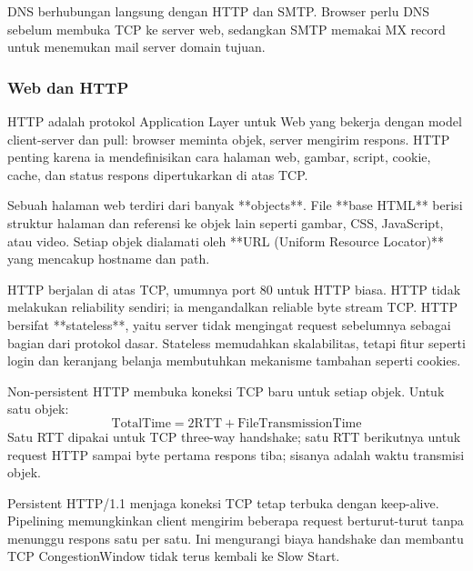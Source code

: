 DNS berhubungan langsung dengan HTTP dan SMTP. Browser perlu DNS sebelum membuka TCP ke server web, sedangkan SMTP memakai MX record untuk menemukan mail server domain tujuan.

\subsubsection{Web dan HTTP}
\begin{jawab}
HTTP adalah protokol Application Layer untuk Web yang bekerja dengan model client-server dan pull: browser meminta objek, server mengirim respons. HTTP penting karena ia mendefinisikan cara halaman web, gambar, script, cookie, cache, dan status respons dipertukarkan di atas TCP.
\end{jawab}

Sebuah halaman web terdiri dari banyak **objects**. File **base HTML** berisi struktur halaman dan referensi ke objek lain seperti gambar, CSS, JavaScript, atau video. Setiap objek dialamati oleh **URL (Uniform Resource Locator)** yang mencakup hostname dan path.

HTTP berjalan di atas TCP, umumnya port 80 untuk HTTP biasa. HTTP tidak melakukan reliability sendiri; ia mengandalkan reliable byte stream TCP. HTTP bersifat **stateless**, yaitu server tidak mengingat request sebelumnya sebagai bagian dari protokol dasar. Stateless memudahkan skalabilitas, tetapi fitur seperti login dan keranjang belanja membutuhkan mekanisme tambahan seperti cookies.

Non-persistent HTTP membuka koneksi TCP baru untuk setiap objek. Untuk satu objek:
\[
    \text{TotalTime} = 2\text{RTT} + \text{FileTransmissionTime}
\]
Satu RTT dipakai untuk TCP three-way handshake; satu RTT berikutnya untuk request HTTP sampai byte pertama respons tiba; sisanya adalah waktu transmisi objek.

Persistent HTTP/1.1 menjaga koneksi TCP tetap terbuka dengan keep-alive. Pipelining memungkinkan client mengirim beberapa request berturut-turut tanpa menunggu respons satu per satu. Ini mengurangi biaya handshake dan membantu TCP CongestionWindow tidak terus kembali ke Slow Start.

